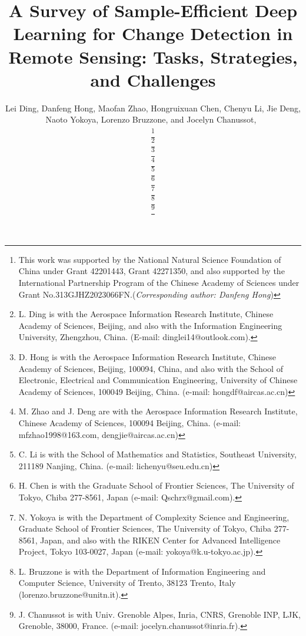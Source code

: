 \documentclass[journal]{IEEEtran}
\begin{document}
\title{A Survey of Sample-Efficient Deep Learning for Change Detection in Remote Sensing: Tasks, Strategies, and Challenges}

\author{
Lei Ding, %
Danfeng Hong, 
Maofan Zhao, 
Hongruixuan Chen,
Chenyu Li, 
Jie Deng,
Naoto Yokoya, 
Lorenzo Bruzzone, 
and Jocelyn Chanussot,~

\thanks{This work was supported by the National Natural Science Foundation of China under Grant 42201443, Grant 42271350, and also supported by the International Partnership Program of the Chinese Academy of Sciences under Grant No.313GJHZ2023066FN.(\emph{Corresponding author: Danfeng Hong})}

\thanks{L. Ding is with the Aerospace Information Research Institute, Chinese Academy of Sciences, Beijing, and also with the Information Engineering University, Zhengzhou, China. (E-mail: dinglei14@outlook.com).}

\thanks{D. Hong is with the Aerospace Information Research Institute, Chinese Academy of Sciences, Beijing, 100094, China, and also with the School of Electronic, Electrical and Communication Engineering, University of Chinese Academy of Sciences, 100049 Beijing, China. (e-mail: hongdf@aircas.ac.cn)}

\thanks{M. Zhao and J. Deng are with the Aerospace Information Research Institute, Chinese Academy of Sciences, 100094 Beijing, China. (e-mail: mfzhao1998@163.com, dengjie@aircas.ac.cn)}

\thanks{C. Li is with the School of Mathematics and Statistics, Southeast University, 211189 Nanjing, China. (e-mail: lichenyu@seu.edu.cn)}

\thanks{H. Chen is with the Graduate School of Frontier Sciences, The University of Tokyo, Chiba 277-8561, Japan (e-mail: Qschrx@gmail.com).}

\thanks{N. Yokoya is with the Department of Complexity Science and Engineering, Graduate School of Frontier Sciences, The University of Tokyo, Chiba 277-8561, Japan, and also with the RIKEN Center for Advanced Intelligence Project, Tokyo 103-0027, Japan (e-mail: yokoya@k.u-tokyo.ac.jp).}

\thanks{L. Bruzzone is with the Department of Information Engineering and Computer Science, University of Trento, 38123 Trento, Italy (lorenzo.bruzzone@unitn.it).}

\thanks{J. Chanussot is with Univ. Grenoble Alpes, Inria, CNRS, Grenoble INP, LJK, Grenoble, 38000, France. (e-mail: jocelyn.chanussot@inria.fr).}

}
\end{document}
